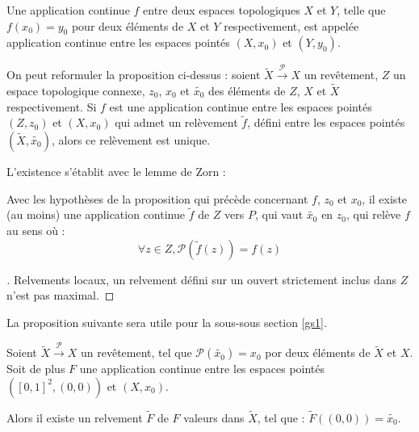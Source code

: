 \begin{rema}
Une application continue $f$ entre deux espaces topologiques $X$ et $Y$, telle que $f(x_0)=y_0$ %
pour deux \'el\'ements de $X$ et $Y$ respectivement, est appel\'ee application continue entre les espaces point\'es $(X,x_0)$ et $(Y,y_0)$.

On peut reformuler la proposition ci-dessus : %
soient $\tilde{X}\overset{\mathcal{P}}{\longrightarrow} X$ un rev\^etement, $Z$ un espace topologique connexe, $z_0$, $x_0$ et $\tilde{x_0}$ des \'el\'ements de $Z$, $X$ et $\tilde{X}$ respectivement. %
Si $f$ est une application continue entre les espaces point\'es $(Z,z_0)$ et $(X,x_0)$ qui admet un rel\`evement $\tilde{f}$, d\'efini entre les espaces point\'es $(\tilde{X},\tilde{x_0})$, alors ce rel\`evement est unique.
\end{rema}

L'existence s'\'etablit avec le lemme de Zorn :

\begin{prop}
Avec les hypoth\`eses de la proposition qui pr\'ec\`ede concernant $f$, $z_0$ et $x_0$, il existe (au moins) une application continue $\tilde{f}$ de $Z$ vers $P$, %
qui vaut $\tilde{x_0}$ en $z_0$, qui rel\`eve $f$ au sens o\`u :
\[\forall z\in Z, \mathcal{P}(\tilde{f}(z))=f(z)\]
\end{prop}

\begin{proof}[\es]
Relvements locaux, un relvement d\'efini sur un ouvert strictement inclus dans $Z$ n'est pas maximal.
\end{proof}


La proposition suivante sera utile pour la sous-sous section \ref{gs1}.%

\begin{prop}\label{red2}
Soient $\tilde{X}\overset{\mathcal{P}}{\longrightarrow} X$ un rev\^etement, tel que $\mathcal{P}(\tilde{x_0})=x_0$ por deux \'el\'ements de $\tilde{X}$ et $X$. %
Soit de plus $F$ une application continue entre les espaces point\'es $([0,1]^2,(0,0))$ et $(X,x_0)$.

Alors il existe un relvement $\tilde{F}$ de $F$  valeurs dans $\tilde{X}$, tel que : $\tilde{F}((0,0))=\tilde{x_0}$.
\end{prop}

